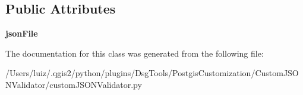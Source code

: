 \subsection*{Public Attributes}
\begin{DoxyCompactItemize}
\item 
\mbox{\label{class_dsg_tools_1_1_postgis_customization_1_1_custom_j_s_o_n_validator_1_1custom_j_s_o_n_validator_1_1_custom_j_s_o_n_validator_ae30f530a1a2ad9a95b84383da7b9092a}} 
{\bfseries json\+File}
\end{DoxyCompactItemize}


The documentation for this class was generated from the following file\+:\begin{DoxyCompactItemize}
\item 
/\+Users/luiz/.\+qgis2/python/plugins/\+Dsg\+Tools/\+Postgis\+Customization/\+Custom\+J\+S\+O\+N\+Validator/custom\+J\+S\+O\+N\+Validator.\+py\end{DoxyCompactItemize}
